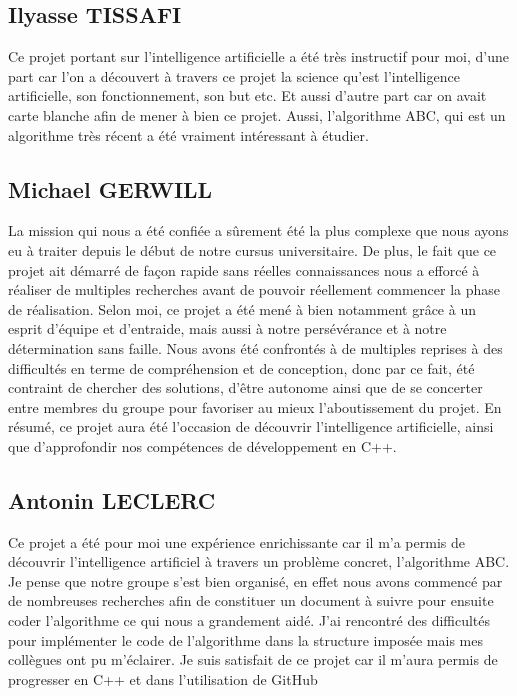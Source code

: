\documentclass[a4paper, fontsize=11pt]{article}
\begin{document}
\subsection{Ilyasse TISSAFI}
Ce projet portant sur l’intelligence artificielle a été très instructif pour moi, d’une part car l’on a découvert à travers ce projet la science qu’est l’intelligence artificielle, son fonctionnement, son but etc. Et aussi d’autre part car on avait carte blanche afin de mener à bien ce projet. Aussi, l’algorithme ABC, qui est un algorithme très récent a été vraiment intéressant à étudier.

\subsection{Michael GERWILL}
La mission qui nous a été confiée a sûrement été la plus complexe que nous ayons eu à traiter depuis le début de notre cursus universitaire. De plus, le fait que ce projet ait démarré de façon rapide sans réelles connaissances nous a efforcé à réaliser de multiples recherches avant de pouvoir réellement commencer la phase de réalisation. Selon moi, ce projet a été mené à bien notamment grâce à un esprit d'équipe et d'entraide, mais aussi à notre persévérance et à notre détermination sans faille. Nous avons été confrontés à de multiples reprises à des difficultés en terme de compréhension et de conception, donc par ce fait, été contraint de chercher des solutions, d'être autonome ainsi que de se concerter entre membres du groupe pour favoriser au mieux l'aboutissement du projet. En résumé, ce projet aura été l'occasion de découvrir l'intelligence artificielle, ainsi que d'approfondir nos compétences de développement en C++.

\subsection{Antonin LECLERC}

Ce projet a été pour moi une expérience enrichissante car il m’a permis de découvrir l’intelligence
artificiel à travers un problème concret, l’algorithme ABC. Je pense que notre groupe s’est bien
organisé, en effet nous avons commencé par de nombreuses recherches afin de constituer un
document à suivre pour ensuite coder l’algorithme ce qui nous a grandement aidé.
J’ai rencontré des difficultés pour implémenter le code de l’algorithme dans la structure imposée
mais mes collègues ont pu m’éclairer. Je suis satisfait de ce projet car il m’aura permis de progresser
en C++ et dans l’utilisation de GitHub

\newpage



\end{document}
